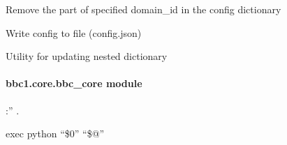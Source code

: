 \documentclass[letterpaper,10pt,english]{sphinxmanual}
\begin{document}
\begin{fulllineitems}
\begin{fulllineitems}
\end{fulllineitems}


\begin{fulllineitems}
\label{\detokenize{bbc1.core.bbc_config:bbc1.core.bbc_config.BBcConfig.remove_domain_config}}
Remove the part of specified domain\_id in the config dictionary

\end{fulllineitems}


\begin{fulllineitems}
\label{\detokenize{bbc1.core.bbc_config:bbc1.core.bbc_config.BBcConfig.update_config}}
Write config to file (config.json)

\end{fulllineitems}


\end{fulllineitems}


\begin{fulllineitems}
\label{\detokenize{bbc1.core.bbc_config:bbc1.core.bbc_config.update_deep}}
Utility for updating nested dictionary

\end{fulllineitems}



\paragraph{bbc1.core.bbc\_core module}
\label{\detokenize{bbc1.core.bbc_core:module-bbc1.core.bbc_core}}\label{\detokenize{bbc1.core.bbc_core:bbc1-core-bbc-core-module}}\label{\detokenize{bbc1.core.bbc_core::doc}}
:” .

exec python “\$0” “\$@”
\end{document}
